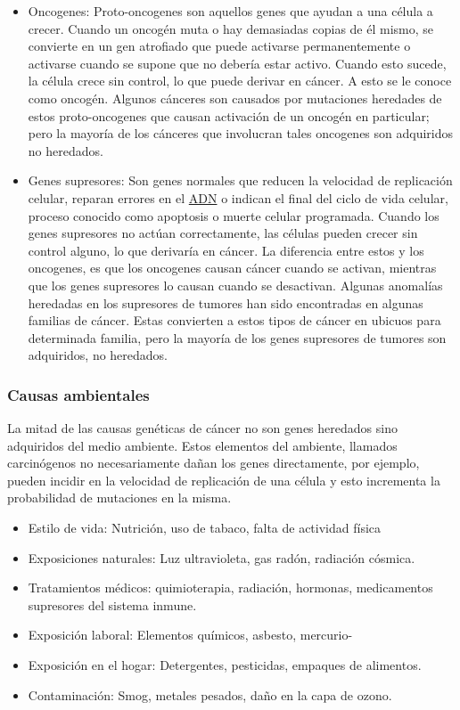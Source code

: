 \begin{itemize}
    \item{Oncogenes}: Proto-oncogenes son aquellos genes que ayudan a una célula
    a crecer. Cuando un oncogén muta o hay demasiadas copias de él mismo, se
    convierte en un gen atrofiado que puede activarse permanentemente o
    activarse cuando se supone que no debería estar activo. Cuando esto sucede,
    la célula crece sin control, lo que puede derivar en cáncer. A esto se le
    conoce como oncogén. Algunos cánceres son causados por mutaciones heredades
    de estos proto-oncogenes que causan activación de un oncogén en particular;
    pero la mayoría de los cánceres que involucran tales oncogenes son
    adquiridos no heredados.
    \item{Genes supresores}: Son genes normales que reducen la velocidad de
    replicación celular, reparan errores en el \hyperlink{abbr}{ADN} o indican el final del ciclo
    de vida celular, proceso conocido como apoptosis o muerte celular
    programada. Cuando los genes supresores no actúan correctamente, las células
    pueden crecer sin control alguno, lo que derivaría en cáncer. La diferencia
    entre estos y los oncogenes, es que los oncogenes causan cáncer cuando se
    activan, mientras que los genes supresores lo causan cuando se desactivan.
    Algunas anomalías heredadas en los supresores de tumores han sido
    encontradas en algunas familias de cáncer. Estas convierten a estos tipos de
    cáncer en ubicuos para determinada familia, pero la mayoría de los genes
    supresores de tumores son adquiridos, no heredados.
\end{itemize}

\subsubsection{Causas ambientales}

La mitad de las causas genéticas de cáncer no son
genes heredados sino adquiridos del medio ambiente. Estos elementos del
ambiente, llamados carcinógenos no necesariamente dañan los genes directamente,
por ejemplo, pueden incidir en la velocidad de replicación de una célula y esto
incrementa la probabilidad de mutaciones en la misma.

\begin{itemize}
    \item{Estilo de vida}: Nutrición, uso de tabaco, falta de actividad física
    \item{Exposiciones naturales}: Luz ultravioleta, gas radón, radiación
    cósmica.
    \item{Tratamientos médicos}: quimioterapia, radiación, hormonas,
    medicamentos supresores del sistema inmune.
    \item{Exposición laboral}: Elementos químicos, asbesto, mercurio-
    \item{Exposición en el hogar}: Detergentes, pesticidas, empaques de
    alimentos.
    \item{Contaminación}: Smog, metales pesados, daño en la capa de ozono.     
\end{itemize}


